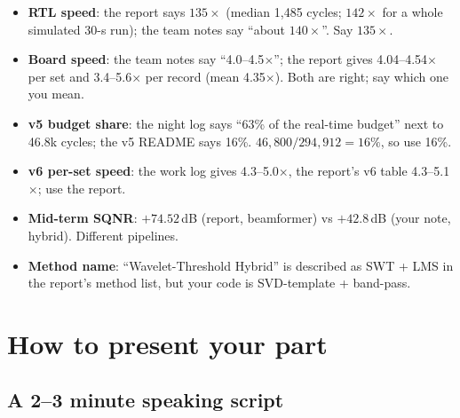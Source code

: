 \documentclass[11pt]{article}
\begin{document}
\begin{warn}
\begin{itemize}
  \item \textbf{RTL speed}: the report says $135\times$ (median 1,485 cycles; $142\times$ for a whole simulated 30-s run); the team notes say ``about $140\times$''. Say $135\times$.
  \item \textbf{Board speed}: the team notes say ``4.0--4.5$\times$''; the report gives 4.04--4.54$\times$ per set and 3.4--5.6$\times$ per record (mean 4.35$\times$). Both are right; say which one you mean.
  \item \textbf{v5 budget share}: the night log says ``63\% of the real-time budget'' next to 46.8k cycles; the v5 README says 16\%. $46{,}800/294{,}912 = 16\%$, so use 16\%.
  \item \textbf{v6 per-set speed}: the work log gives 4.3--5.0$\times$, the report's v6 table 4.3--5.1$\times$; use the report.
  \item \textbf{Mid-term SQNR}: $+74.52$\,dB (report, beamformer) vs $+42.8$\,dB (your note, hybrid). Different pipelines.
  \item \textbf{Method name}: ``Wavelet-Threshold Hybrid'' is described as SWT + LMS in the report's method list, but your code is SVD-template + band-pass.
\end{itemize}
\end{warn}

\section{How to present your part}
\label{sec:present}

\subsection{A 2--3 minute speaking script}
\end{document}
